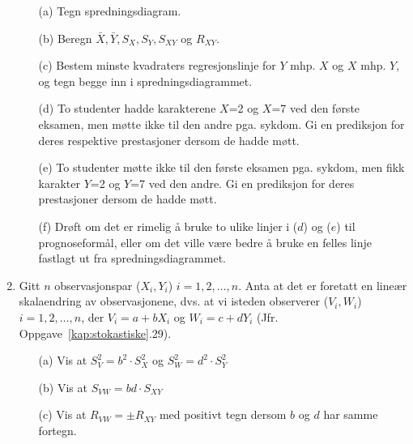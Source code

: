 \begin{enumerate}
\begin{itemize}
\item[(a)] Tegn spredningsdiagram.
\item[(b)] Beregn $\bar{X}, \bar{Y}, S_X, S_Y, S_{XY}$ og $R_{XY}$.
\item[(c)] Bestem minste kvadraters regresjonslinje for $Y$ mhp. $X$
           og $X$ mhp. $Y$, og tegn begge inn i spredningsdiagrammet.
\item[(d)] To studenter hadde karakterene $X$=2 og $X$=7 ved den første
           eksamen, men møtte ikke til den andre pga. sykdom.  Gi en 
           prediksjon for deres respektive prestasjoner dersom de hadde 
           møtt.
\item[(e)] To studenter møtte ikke til den første eksamen pga.
           sykdom, men fikk karakter $Y$=2 og $Y$=7 ved den andre.  Gi en
           prediksjon for deres prestasjoner dersom de hadde møtt.
\item[(f)] Drøft om det er rimelig å bruke to ulike linjer i
           ($d$) og ($e$) til prognoseformål, eller om det ville være
           bedre å bruke en felles linje fastlagt ut fra 
           spredningsdiagrammet.
\end{itemize}
\item
Gitt $n$ observasjonspar ($X_i, Y_i$) $i = 1,2,\ldots, n$.  Anta at det 
er foretatt en lineær skalaendring av observasjonene, dvs. at vi
isteden observerer ($V_i, W_i$) $i = 1,2,\ldots, n$, der $V_i = a+bX_i$
og $W_i = c+dY_i$ (Jfr. Oppgave~\ref*{kap:stokastiske}.29).

\begin{itemize}
\item[(a)] Vis at $S^2_V = b^2\cdot S^2_X$ og $S^2_W = d^2\cdot S^2_Y$
\item[(b)] Vis at $S_{VW} = bd\cdot S_{XY}$
\item[(c)] Vis at $R_{VW} = \pm R_{XY}$ med positivt tegn dersom $b$
og $d$ har samme fortegn.
\end{itemize}

\end{enumerate}
\normalsize

